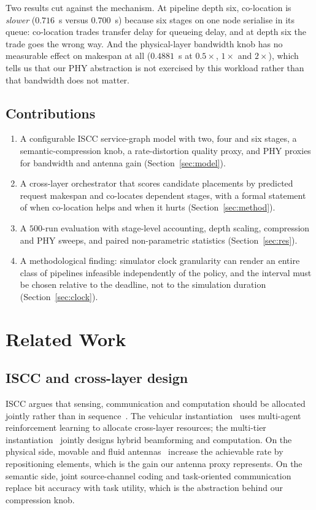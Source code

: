 \documentclass[journal,10pt]{IEEEtran}
\begin{document}
Two results cut against the mechanism. At pipeline depth six, co-location is
\emph{slower} ($0.716$~s versus $0.700$~s) because six stages on one node
serialise in its queue: co-location trades transfer delay for queueing delay,
and at depth six the trade goes the wrong way. And the physical-layer bandwidth
knob has no measurable effect on makespan at all ($0.4881$~s at $0.5\times$,
$1\times$ and $2\times$), which tells us that our PHY abstraction is not
exercised by this workload rather than that bandwidth does not matter.

\subsection{Contributions}
\begin{enumerate}
\item A configurable ISCC service-graph model with two, four and six stages, a
  semantic-compression knob, a rate-distortion quality proxy, and PHY proxies
  for bandwidth and antenna gain (Section~\ref{sec:model}).
\item A cross-layer orchestrator that scores candidate placements by predicted
  request makespan and co-locates dependent stages, with a formal statement of
  when co-location helps and when it hurts (Section~\ref{sec:method}).
\item A $500$-run evaluation with stage-level accounting, depth scaling,
  compression and PHY sweeps, and paired non-parametric statistics
  (Section~\ref{sec:res}).
\item A methodological finding: simulator clock granularity can render an
  entire class of pipelines infeasible independently of the policy, and the
  interval must be chosen relative to the deadline, not to the simulation
  duration (Section~\ref{sec:clock}).
\end{enumerate}

\section{Related Work}
\label{sec:related}

\subsection{ISCC and cross-layer design}
ISCC argues that sensing, communication and computation should be allocated
jointly rather than in sequence~\cite{liu2020jrc,liu2026iscc}. The vehicular
instantiation~\cite{indulekha2026iscc} uses multi-agent reinforcement learning
to allocate cross-layer resources; the multi-tier
instantiation~\cite{liu2026iscc} jointly designs hybrid beamforming and
computation. On the physical side, movable and fluid
antennas~\cite{chen2026movable,wang2026movablemec,liu2026fluid} increase the
achievable rate by repositioning elements, which is the gain our antenna proxy
represents. On the semantic side, joint source-channel coding and task-oriented
communication~\cite{gunduz2023semantic,bourtsoulatze2019jscc} replace bit
accuracy with task utility, which is the abstraction behind our compression
knob.
\end{document}

